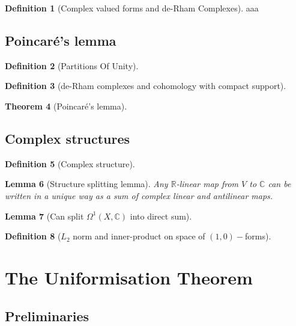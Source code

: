 \documentclass[11pt]{report}
\newtheorem{thm}{Theorem}[section]
\newtheorem{lemma}[thm]{Lemma}
\theoremstyle{definition}
\newtheorem{defn}[thm]{Definition}
\begin{document}
\begin{defn}[Complex valued forms and de-Rham Complexes]\label{Cforms}
  aaa
\end{defn}

\section{Poincar\'{e}'s lemma}

\begin{defn}[Partitions Of Unity]
  
\end{defn}

\begin{defn}[de-Rham complexes and cohomology with compact support]
  
\end{defn}

\begin{thm}[Poincar\'{e}'s lemma]
  
\end{thm}

\section{Complex structures}

\begin{defn}[Complex structure]\label{Cstructure}
  
\end{defn}

\begin{lemma}[Structure splitting lemma]
  Any $\mathbb{R}$-linear map from $V$ to $\mathbb{C}$ can be written in a unique way as a sum of complex linear and antilinear maps.
\end{lemma}

\begin{lemma}[Can split $\Omega^1(X,\mathbb{C})$ into direct sum]
  
\end{lemma}

\begin{defn}[$L_2$ norm and inner-product on space of $(1,0)-$forms]\label{InnerProduct}
  
\end{defn}
\chapter{The Uniformisation Theorem}
\section{Preliminaries}
\end{document}
